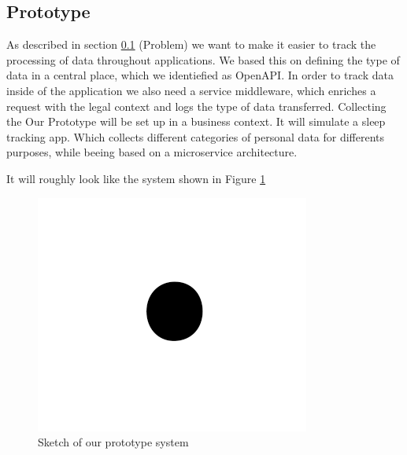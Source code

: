 


\subsection{Prototype}

As described in section \ref{} (Problem) we want to make it easier to track the processing of data throughout applications. We based this on defining the type of data in a central place, which we identiefied as OpenAPI. In order to track data inside of the application we also need a service middleware, which enriches a request with the legal context and logs the type of data transferred. 
Collecting the 
Our Prototype will be set up in a business context. It will simulate a sleep tracking app. Which collects different categories of personal data for differents purposes, while beeing based on a microservice architecture. 

It will roughly look like the system shown in Figure \ref{fig}

\begin{figure}[htbp]
\centerline{\includegraphics{fig1.png}}
\caption{Sketch of our prototype system}
\label{fig}
\end{figure}

